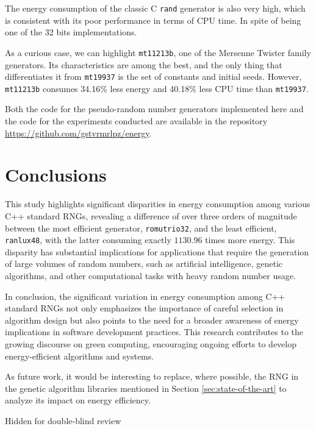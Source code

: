 \documentclass[dvipsnames,format=sigconf,anonymous=true,review=true]{acmart}
\begin{document}
The energy consumption of the classic C \texttt{rand} generator is also very high, which is consistent with its poor performance in terms of CPU time. In spite of being one of the 32 bits implementations.

As a curious case, we can highlight \texttt{mt11213b}, one of the Mersenne Twister family generators. Its characteristics are among the best, and the only thing that differentiates it from \texttt{mt19937} is the set of constants and initial seeds. However, \texttt{mt11213b} consumes 34.16\% less energy and 40.18\% less CPU time than \texttt{mt19937}.

Both the code for the pseudo-random number generators implemented here and the code for the experiments conducted are available in the repository \url{https://github.com/gstvrmrlpz/energy}.

\section{Conclusions}
\label{sec:conclusions}

This study highlights significant disparities in energy consumption among various C++ standard RNGs, revealing a difference of over three orders of magnitude between the most efficient generator, \texttt{romutrio32}, and the least efficient, \texttt{ranlux48}, with the latter consuming exactly $1130.96$ times more energy. This disparity has substantial implications for applications that require the generation of large volumes of random numbers, such as artificial intelligence, genetic algorithms, and other computational tasks with heavy random number usage.

In conclusion, the significant variation in energy consumption among C++ standard RNGs not only emphasizes the importance of careful selection in algorithm design but also points to the need for a broader awareness of energy implications in software development practices. This research contributes to the growing discourse on green computing, encouraging ongoing efforts to develop energy-efficient algorithms and systems.

As future work, it would be interesting to replace, where possible, the RNG in the genetic algorithm libraries mentioned in Section \ref{sec:state-of-the-art} to analyze its impact on energy efficiency.

\begin{acks}
Hidden for double-blind review
\end{acks}



\end{document}
